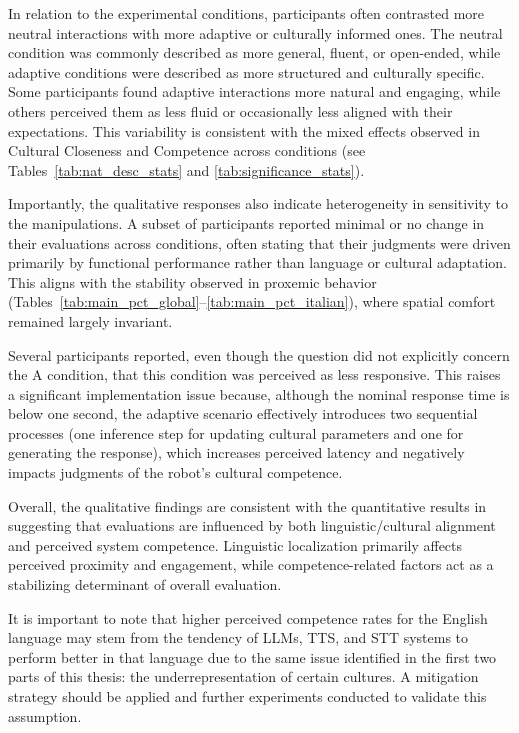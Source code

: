 In relation to the experimental conditions, participants often contrasted more neutral interactions with more adaptive or culturally informed ones. The neutral condition was commonly described as more general, fluent, or open-ended, while adaptive conditions were described as more structured and culturally specific. Some participants found adaptive interactions more natural and engaging, while others perceived them as less fluid or occasionally less aligned with their expectations. This variability is consistent with the mixed effects observed in Cultural Closeness and Competence across conditions (see Tables~\ref{tab:nat_desc_stats} and \ref{tab:significance_stats}).

Importantly, the qualitative responses also indicate heterogeneity in sensitivity to the manipulations. A subset of participants reported minimal or no change in their evaluations across conditions, often stating that their judgments were driven primarily by functional performance rather than language or cultural adaptation. This aligns with the stability observed in proxemic behavior (Tables~\ref{tab:main_pct_global}--\ref{tab:main_pct_italian}), where spatial comfort remained largely invariant.

Several participants reported, even though the question did not explicitly concern the A condition, that this condition was perceived as less responsive. This raises a significant implementation issue because, although the nominal response time is below one second, the adaptive scenario effectively introduces two sequential processes (one inference step for updating cultural parameters and one for generating the response), which increases perceived latency and negatively impacts judgments of the robot’s cultural competence.

Overall, the qualitative findings are consistent with the quantitative results in suggesting that evaluations are influenced by both linguistic/cultural alignment and perceived system competence. Linguistic localization primarily affects perceived proximity and engagement, while competence-related factors act as a stabilizing determinant of overall evaluation.

It is important to note that higher perceived competence rates for the English language may stem from the tendency of LLMs, TTS, and STT systems to perform better in that language due to the same issue identified in the first two parts of this thesis: the underrepresentation of certain cultures. A mitigation strategy should be applied and further experiments conducted to validate this assumption.

